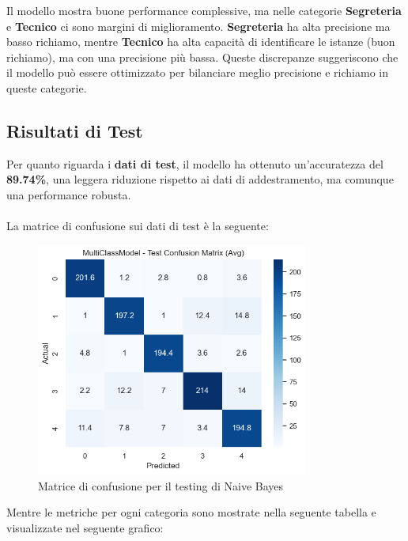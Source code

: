 Il modello mostra buone performance complessive, ma nelle categorie \textbf{Segreteria} e \textbf{Tecnico} ci sono margini di miglioramento. \textbf{Segreteria} ha alta precisione ma basso richiamo, mentre \textbf{Tecnico} ha alta capacità di identificare le istanze (buon richiamo), ma con una precisione più bassa. Queste discrepanze suggeriscono che il modello può essere ottimizzato per bilanciare meglio precisione e richiamo in queste categorie.

\newpage

\subsection{Risultati di Test}

Per quanto riguarda i \textbf{dati di test}, il modello ha ottenuto un'accuratezza del \textbf{89.74\%}, una leggera riduzione rispetto ai dati di addestramento, ma comunque una performance robusta. \\ \\
La matrice di confusione sui dati di test è la seguente:

\begin{figure}[H]
    \centering
    \includegraphics[width=0.8\textwidth]{images/confusion_matrix_test_naive_bayes.png}
    \caption{Matrice di confusione per il testing di Naive Bayes}
    \label{fig:confusion_matrix_test_naive_bayes}
\end{figure}

Mentre le metriche per ogni categoria sono mostrate nella seguente tabella e visualizzate nel seguente grafico:

